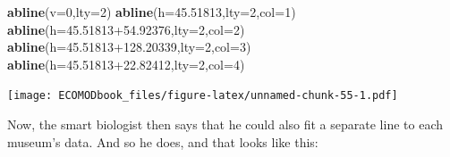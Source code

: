 \documentclass[
]{book}
\newenvironment{Shaded}{\begin{snugshade}}{\end{snugshade}}
\newcommand{\DataTypeTok}[1]{\textcolor[rgb]{0.13,0.29,0.53}{#1}}
\newcommand{\DecValTok}[1]{\textcolor[rgb]{0.00,0.00,0.81}{#1}}
\newcommand{\FloatTok}[1]{\textcolor[rgb]{0.00,0.00,0.81}{#1}}
\newcommand{\KeywordTok}[1]{\textcolor[rgb]{0.13,0.29,0.53}{\textbf{#1}}}
\newcommand{\NormalTok}[1]{#1}
\begin{document}
\begin{Shaded}
\begin{Highlighting}[]
\KeywordTok{abline}\NormalTok{(}\DataTypeTok{v=}\DecValTok{0}\NormalTok{,}\DataTypeTok{lty=}\DecValTok{2}\NormalTok{)}
\KeywordTok{abline}\NormalTok{(}\DataTypeTok{h=}\FloatTok{45.51813}\NormalTok{,}\DataTypeTok{lty=}\DecValTok{2}\NormalTok{,}\DataTypeTok{col=}\DecValTok{1}\NormalTok{)}
\KeywordTok{abline}\NormalTok{(}\DataTypeTok{h=}\FloatTok{45.51813+54.92376}\NormalTok{,}\DataTypeTok{lty=}\DecValTok{2}\NormalTok{,}\DataTypeTok{col=}\DecValTok{2}\NormalTok{)}
\KeywordTok{abline}\NormalTok{(}\DataTypeTok{h=}\FloatTok{45.51813+128.20339}\NormalTok{,}\DataTypeTok{lty=}\DecValTok{2}\NormalTok{,}\DataTypeTok{col=}\DecValTok{3}\NormalTok{)}
\KeywordTok{abline}\NormalTok{(}\DataTypeTok{h=}\FloatTok{45.51813+22.82412}\NormalTok{,}\DataTypeTok{lty=}\DecValTok{2}\NormalTok{,}\DataTypeTok{col=}\DecValTok{4}\NormalTok{)}
\end{Highlighting}
\end{Shaded}

\texttt{[image: ECOMODbook\_files/figure-latex/unnamed-chunk-55-1.pdf]}

Now, the smart biologist then says that he could also fit a separate line to each museum's data. And so he does, and that looks like this:
\end{document}
